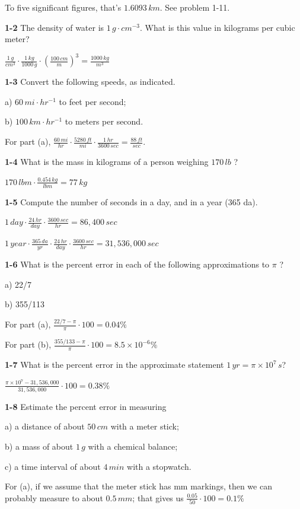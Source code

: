 \documentclass{amsart}
\begin{document}
To five significant figures, that's $1.6093 \, km$.  See problem 1-11.

\textbf{1-2} The density of water is $1 \, g \cdot cm^{-3}$.
What is this value in kilograms per cubic meter?

$\frac{1 \, g}{cm^{3}} \cdot \frac{1 \, kg}{1000 \, g} \cdot {\left( \frac{100 \, cm}{m} \right)}^{3}
= \frac{1000 \, kg}{m^{3}}$

\textbf{1-3} Convert the following speeds, as indicated.

a) $60 \, mi \cdot hr^{-1}$ to feet per second;

b) $100 \, km \cdot hr^{-1}$ to meters per second.

For part (a), $\frac{60 \, mi}{hr} \cdot \frac{5280 \, ft}{mi} \cdot \frac{1 \, hr}{3600 \, sec}
= \frac{88 \, ft}{sec}$.

\textbf{1-4} What is the mass in kilograms  of a person weighing $170 \, lb$ ?

$170 \, lbm \cdot \frac{0.454 \, kg}{lbm} = 77 \, kg$

\textbf{1-5} Compute the number of seconds in a day, and in a year (365 da).

$1 \, day \cdot \frac{24 \, hr}{day} \cdot \frac{3600 \, sec}{hr} = 86,400 \, sec$

$1 \, year \cdot \frac{365 \, da}{yr} \cdot \frac{24 \, hr}{day} \cdot \frac{3600 \, sec}{hr}
= 31,536,000 \, sec$

\textbf{1-6} What is the percent error in each of the following approximations to $\pi$ ?

a) 22/7

b) 355/113

For part (a), $\frac{22/7-\pi}{\pi} \cdot 100 = 0.04\%$

For part (b), $\frac{355/133 - \pi}{\pi} \cdot 100 = 8.5 \times 10^{-6}\%$

\textbf{1-7} What is the percent error in the approximate statement $1\,yr = \pi \times 10^{7}\,s$?

$\frac{\pi \times 10^{7} - 31,536,000}{31,536,000} \cdot 100 = 0.38\%$

\textbf{1-8} Estimate the percent error in measuring

a) a distance of about $50\,cm$ with a meter stick;

b) a mass of about $1\,g$ with a chemical balance;

c) a time interval of about $4\,min$ with a stopwatch.

For (a), if we assume that the meter stick has mm markings,
then we can probably measure to about $0.5\,mm$;
that gives us $\frac{0.05}{50} \cdot 100 = 0.1\%$
\end{document}
